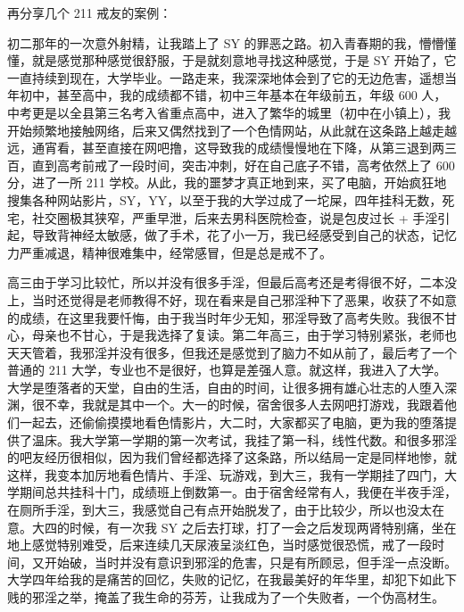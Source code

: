 再分享几个 211 戒友的案例：

\begin{case}
    初二那年的一次意外射精，让我踏上了 SY 的罪恶之路。初入青春期的我，懵懵懂懂，就是感觉那种感觉很舒服，于是就刻意地寻找这种感觉，于是 SY 开始了，它一直持续到现在，大学毕业。一路走来，我深深地体会到了它的无边危害，遥想当年初中，甚至高中，我的成绩都不错，初中三年基本在年级前五，年级 600 人，中考更是以全县第三名考入省重点高中，进入了繁华的城里（初中在小镇上），我开始频繁地接触网络，后来又偶然找到了一个色情网站，从此就在这条路上越走越远，通宵看，甚至直接在网吧撸，这导致我的成绩慢慢地在下降，从第三退到两三百，直到高考前戒了一段时间，突击冲刺，好在自己底子不错，高考依然上了 600 分，进了一所 211 学校。从此，我的噩梦才真正地到来，买了电脑，开始疯狂地搜集各种网站影片，SY，YY，以至于我的大学过成了一坨屎，四年挂科无数，死宅，社交圈极其狭窄，严重早泄，后来去男科医院检查，说是包皮过长 + 手淫引起，导致背神经太敏感，做了手术，花了小一万，我已经感受到自己的状态，记忆力严重减退，精神很难集中，经常感冒，但是总是戒不了。
\end{case}

\begin{case}
    高三由于学习比较忙，所以并没有很多手淫，但最后高考还是考得很不好，二本没上，当时还觉得是老师教得不好，现在看来是自己邪淫种下了恶果，收获了不如意的成绩，在这里我要忏悔，由于我当时年少无知，邪淫导致了高考失败。我很不甘心，母亲也不甘心，于是我选择了复读。第二年高三，由于学习特别紧张，老师也天天管着，我邪淫并没有很多，但我还是感觉到了脑力不如从前了，最后考了一个普通的 211 大学，专业也不是很好，也算是差强人意。就这样，我进入了大学。大学是堕落者的天堂，自由的生活，自由的时间，让很多拥有雄心壮志的人堕入深渊，很不幸，我就是其中一个。大一的时候，宿舍很多人去网吧打游戏，我跟着他们一起去，还偷偷摸摸地看色情影片，大二时，大家都买了电脑，更为我的堕落提供了温床。我大学第一学期的第一次考试，我挂了第一科，线性代数。和很多邪淫的吧友经历很相似，因为我们曾经都选择了这条路，所以结局一定是同样地惨，就这样，我变本加厉地看色情片、手淫、玩游戏，到大三，我有一学期挂了四门，大学期间总共挂科十门，成绩班上倒数第一。由于宿舍经常有人，我便在半夜手淫，在厕所手淫，到大三，我感觉自己有点开始脱发了，由于比较少，所以也没太在意。大四的时候，有一次我 SY 之后去打球，打了一会之后发现两肾特别痛，坐在地上感觉特别难受，后来连续几天尿液呈淡红色，当时感觉很恐慌，戒了一段时间，又开始破，当时并没有意识到邪淫的危害，只是有所顾忌，但手淫一点没断。大学四年给我的是痛苦的回忆，失败的记忆，在我最美好的年华里，却犯下如此下贱的邪淫之举，掩盖了我生命的芬芳，让我成为了一个失败者，一个伪高材生。
\end{case}

